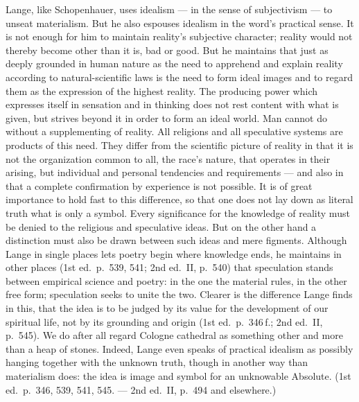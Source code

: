 \documentclass[12pt,a4paper]{book}
\newcommand{\opage}[1]{\marginnote{\footnotesize\textit{[#1]}}}
\begin{document}
Lange, like Schopenhauer, uses idealism --- in the sense of subjectivism --- to
unseat materialism. But he also espouses idealism in the word's practical sense.
It is not enough for him to maintain reality's subjective character; reality
would not thereby become other than it is, bad or good. But he maintains that
just as deeply grounded in human nature as the need to apprehend and explain
reality according to natural-scientific laws is the need to form ideal images and
to regard them as the expression of the highest reality. The producing power
which expresses itself in sensation and in thinking does not rest content with
what is given, but strives beyond it in order to form an ideal world. Man cannot
do without a supplementing of reality. All religions and all speculative systems
are products of this need. They differ from the scientific picture of reality in
that it is not the organization common to all, the race's nature, that operates
in their arising, but individual and personal tendencies and requirements --- and
also in that a complete confirmation by experience is not possible. It is of
great importance to hold fast to this difference, so that one does not lay down
as literal truth what is only a symbol. Every significance for the knowledge of
reality must be denied to the religious and speculative ideas. But on the other
hand a distinction must also be drawn between such ideas and mere figments.
Although Lange in single places lets poetry begin where knowledge ends, he
maintains in other places (1st ed.\ p.~539, 541; 2nd ed.\ II, p.~540) that
speculation stands between empirical science and poetry: in the one the material
rules, in the other free form; speculation seeks to unite the two. Clearer is the
difference Lange finds in this, that the idea is to be judged by its value for
the development of our spiritual life, not by its grounding and origin (1st ed.\
p.~346\,f.; 2nd ed.\ II, p.~545). We do after all regard Cologne cathedral as
something other and more than a heap of stones. Indeed, Lange even speaks of
practical idealism as possibly hanging together with the \opage{551}unknown truth, though in
another way than materialism does: the idea is image and symbol for an
unknowable Absolute. (1st ed.\ p.~346, 539, 541, 545. --- 2nd ed.\ II, p.~494
and elsewhere.)
\end{document}
